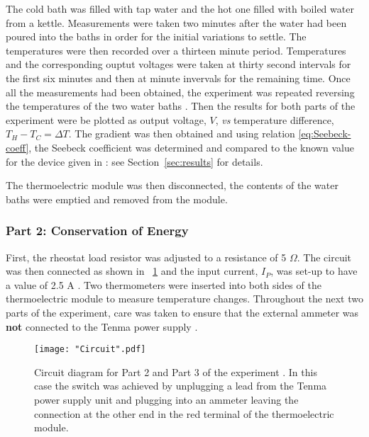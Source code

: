 \documentclass{article}
\newcommand{\figref}[2][\figurename~]{#1\ref{#2}}
\newcommand{\secref}[2][Section~]{#1\ref{#2}}
\begin{document}
\vspace{2mm}  
\noindent
The cold bath was filled with tap water and the hot one filled with boiled water from a kettle. Measurements were taken two minutes after the water had been poured into the baths in order for the initial variations to settle. The temperatures were then recorded over a thirteen minute period. Temperatures and the corresponding ouptut voltages were taken at thirty second intervals for the first six minutes and then at minute invervals for the remaining time. Once all the measurements had been obtained, the experiment was repeated reversing the temperatures of the two water baths \cite{Paper02}. Then the results for both parts of the experiment were be plotted as output voltage, $V$, \textit{vs} temperature difference, $T_H - T_C = \Delta T$. The gradient was then obtained and using relation \eqref{eq:Seebeck-coeff}, the Seebeck coefficient was determined and compared to the known value for the device given in \cite{Paper02}: see \secref{sec:results} for details.

\vspace{2mm}  
\noindent
The thermoelectric module was then disconnected, the contents of the water baths were emptied and removed from the module. 

\subsubsection{Part 2: Conservation of Energy}
\label{sssec:part2}

First, the rheostat load resistor was adjusted to a resistance of 5 $\Omega$. The circuit was then connected as shown in \figref{fig:circuit} \cite{Paper02} and the input current, $I_P$, was set-up to have a value of 2.5 A \cite{Paper02}. Two thermometers were inserted into both sides of the thermoelectric module to measure temperature changes. Throughout the next two parts of the experiment, care was taken to ensure that the external ammeter was \textbf{not} connected to the Tenma power supply \cite{Paper02}.

\begin{figure}[h]
\centering
\texttt{[image: "Circuit".pdf]}
\caption{Circuit diagram for Part 2 and Part 3 of the experiment \cite{Paper02}. In this case the switch was achieved by unplugging a lead from the Tenma power supply unit and plugging into an ammeter leaving the connection at the other end in the red terminal of the thermoelectric module.}
\label{fig:circuit}
\end{figure}
\end{document}
